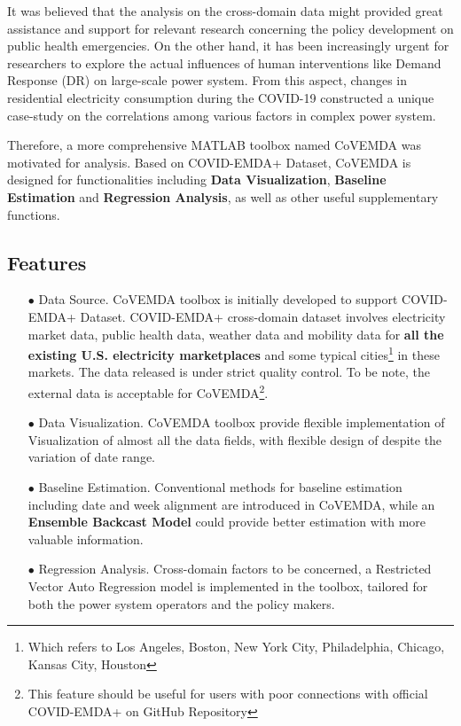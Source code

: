 \documentclass[10pt]{article}
\numberwithin{equation}{section}
\numberwithin{table}{section}
\numberwithin{figure}{section}
\begin{document}
It was believed that the analysis on the cross-domain data might provided great assistance and support for relevant research concerning the policy development on public health emergencies. On the other hand, it has been increasingly urgent for researchers to explore the actual influences of human interventions like Demand Response (DR) on large-scale power system. From this aspect, changes in residential electricity consumption during the COVID-19 constructed a unique case-study on the correlations among various factors in complex power system.

Therefore, a more comprehensive MATLAB toolbox named CoVEMDA was motivated for analysis. Based on COVID-EMDA+ Dataset, CoVEMDA is designed for functionalities including \textbf{Data Visualization}, \textbf{Baseline Estimation} and \textbf{Regression Analysis}, as well as other useful supplementary functions.
\subsection{Features}
\begin{itemize}
    \item[$\bullet$] Data Source. CoVEMDA toolbox is initially developed to support COVID-EMDA+ Dataset. COVID-EMDA+ cross-domain dataset involves electricity market data, public health data, weather data and mobility data for \textbf{all the existing U.S. electricity marketplaces} and some typical cities\footnote{Which refers to Los Angeles, Boston, New York City, Philadelphia, Chicago, Kansas City, Houston} in these markets. The data released is under strict quality control. To be note, the external data is acceptable for CoVEMDA\footnote{This feature should be useful for users with poor connections with official COVID-EMDA+ on GitHub Repository}.
    \item[$\bullet$] Data Visualization. CoVEMDA toolbox provide flexible implementation of Visualization of almost all the data fields, with flexible design of despite the variation of date range.
    \item[$\bullet$] Baseline Estimation. Conventional methods for baseline estimation including date and week alignment are introduced in CoVEMDA, while an \textbf{Ensemble Backcast Model} could provide better estimation with more valuable information.
    \item[$\bullet$] Regression Analysis. Cross-domain factors to be concerned, a Restricted Vector Auto Regression model is implemented in the toolbox, tailored for both the power system operators and the policy makers.
\end{itemize}
\end{document}
